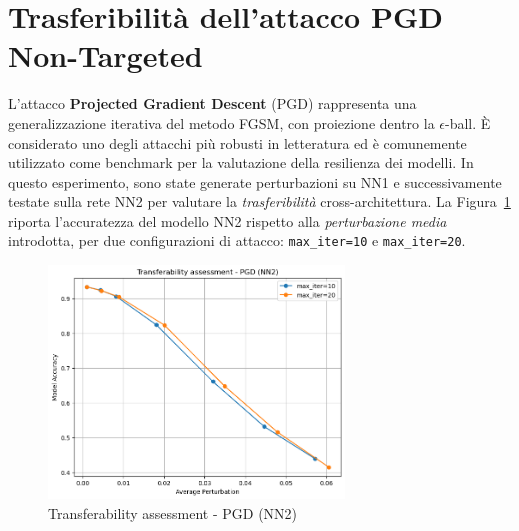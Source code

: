     \section{Trasferibilità dell'attacco PGD Non-Targeted}
        L’attacco \textbf{Projected Gradient Descent} (PGD) rappresenta una generalizzazione iterativa del metodo FGSM, con proiezione dentro la $\epsilon$-ball. È considerato uno degli attacchi più robusti in letteratura ed è comunemente utilizzato come benchmark per la valutazione della resilienza dei modelli. In questo esperimento, sono state generate perturbazioni su NN1 e successivamente testate sulla rete NN2 per valutare la \textit{trasferibilità} cross-architettura.
        La Figura~\ref{fig:pgd_transfer} riporta l’accuratezza del modello NN2 rispetto alla \textit{perturbazione media} introdotta, per due configurazioni di attacco: \texttt{max\_iter=10} e \texttt{max\_iter=20}.
        
        \begin{figure}[H]
          \centering
          \includegraphics[width=0.7\textwidth]{images/untargPGDtrasf.png}
          \caption{Transferability assessment - PGD (NN2)}
          \label{fig:pgd_transfer}
        \end{figure}


